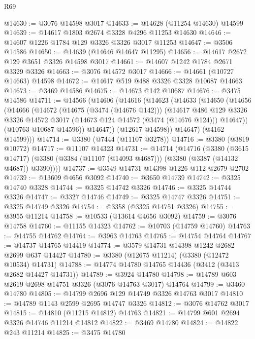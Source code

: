 \begin{lexlean}{R69}
\begin{coremodule}
@14630 := @3076 @14598 @3017
@14633 := @14628 (@11254 @14630) @14599
@14639 := @14617 @1803 @2674 @3328 @4296 @11253 @14630
@14646 := @14607 @1226 @1784 @129 @3326 @3326 @3017 @11253
@14647 := @3506 @14586
@14650 := @14639 (@14646 @14647 @11295)
@14656 := @14617 @2672 @129 @3651 @3326 @14598 @3017
@14661 := @14607 @1242 @1784 @2671 @3329 @3326
@14663 := @3076 @14572 @3017
@14666 := @14661 (@10727 @14663) @14598
@14672 := @14617 @519 @488 @3326 @3328 @10687 @14663
@14673 := @3469 @14586
@14675 := @14673 @142 @10687
@14676 := @3475 @14586
@14711 := @14566
    (@14606
      (@14616
        (@14623
          (@14633
            (@14650
              (@14656
                (@14666
                  (@14672
                    (@14675 (@3474 (@14676 @142)))
                    (@14617
                      @486
                      @129
                      @3326
                      @3326
                      @14572
                      @3017
                      (@14673 @124 @14572 (@3474 (@14676 @124)))
                      @14647))
                  (@10763 @10687 @14596))
                @14647))
            (@12617 @14598))
          @14647)
        (@4162 @14599)))
@14714 := @3380 (@7444 (@11107 @3278))
@14716 := @3380 (@3819 @10772)
@14717 := @11107 @14323
@14731 := @14714
    (@14716
      (@3380
        (@3615 @14717)
        (@3380 (@3384 (@11107 (@14093 @4687))) (@3380 (@3387 (@14132 @4687)) @3390))))
@14737 := @3549 @14731 @14398 @1226 @112 @2679 @2702
@14739 := @13609 @4656 @3092
@14740 := @3650 @14739
@14742 := @3325 @14740 @3328
@14744 := @3325 @14742 @3326
@14746 := @3325 @14744 @3326
@14747 := @3327 @14746
@14749 := @3325 @14747 @3326
@14751 := @3325 @14749 @3326
@14754 := @3358 (@3325 @14751 @3326)
@14755 := @3955 @11214
@14758 := @10533 (@13614 @4656 @3092)
@14759 := @3076 @14758
@14760 := @11155 @14323
@14762 := @10703 (@14759 @14760)
@14763 := @14755 @14762
@14764 := @3963 @14763
@14765 := @14754 @14764
@14767 := @14737 @14765 @14419
@14774 := @3579 @14731 @14398 @1242 @2682 @2699 @637 @14427
@14780 := @3380 (@12675 @11214) (@3380 (@12472 @10534) @14731)
@14788 := @14774 @14780 @14765 @14436 (@3412 (@3413 @2682 @14427 @14731))
@14789 := @3924 @14780
@14798 := @14789 @603 @2619 @2698 @14751 @3326 (@3076 @14763 @3017) @14764
@14799 := @3460 @14780
@14805 := @14799 @2696 @129 @14749 @3326 @14763 @3017
@14810 := @14789 @1143 @2599 @2695 @14747 @3326
@14812 := @3076 @14762 @3017
@14815 := @14810 (@11215 @14812) @14763
@14821 := @14799 @601 @2694 @3326 @14746 @11214 @14812
@14822 := @3469 @14780
@14824 := @14822 @243 @11214
@14825 := @3475 @14780

\end{coremodule}
\end{lexlean}
